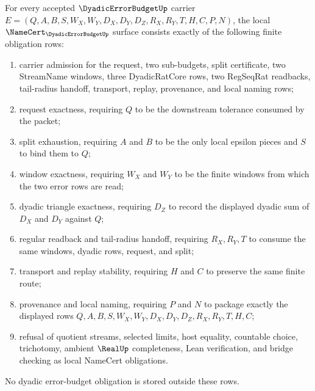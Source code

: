 \begin{theorem}
\label{thm:dyadic-error-budget-namecert-obligations}
For every accepted $\DyadicErrorBudgetUp$ carrier $E=(Q,A,B,S,W_X,W_Y,D_X,D_Y,D_Z,R_X,R_Y,T,H,C,P,N)$, the local $\NameCert_{\DyadicErrorBudgetUp}$ surface consists exactly of the following finite obligation rows:
\begin{enumerate}
\item carrier admission for the request, two sub-budgets, split certificate, two StreamName windows, three DyadicRatCore rows, two RegSeqRat readbacks, tail-radius handoff, transport, replay, provenance, and local naming rows;
\item request exactness, requiring $Q$ to be the downstream tolerance consumed by the packet;
\item split exhaustion, requiring $A$ and $B$ to be the only local epsilon pieces and $S$ to bind them to $Q$;
\item window exactness, requiring $W_X$ and $W_Y$ to be the finite windows from which the two error rows are read;
\item dyadic triangle exactness, requiring $D_Z$ to record the displayed dyadic sum of $D_X$ and $D_Y$ against $Q$;
\item regular readback and tail-radius handoff, requiring $R_X,R_Y,T$ to consume the same windows, dyadic rows, request, and split;
\item transport and replay stability, requiring $H$ and $C$ to preserve the same finite route;
\item provenance and local naming, requiring $P$ and $N$ to package exactly the displayed rows $Q,A,B,S,W_X,W_Y,D_X,D_Y,D_Z,R_X,R_Y,T,H,C$;
\item refusal of quotient streams, selected limits, host equality, countable choice, trichotomy, ambient $\RealUp$ completeness, Lean verification, and bridge checking as local NameCert obligations.
\end{enumerate}
No dyadic error-budget obligation is stored outside these rows.
\end{theorem}

